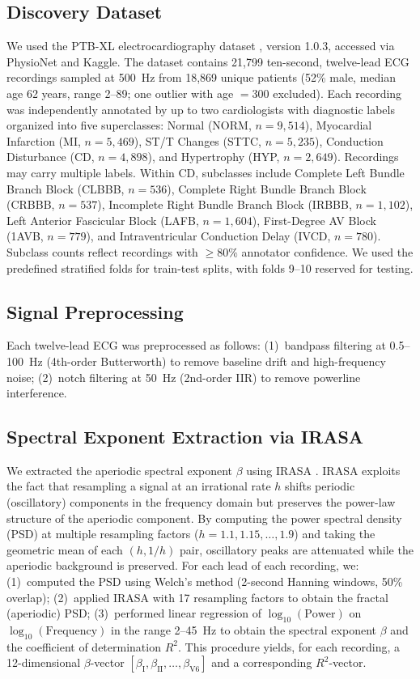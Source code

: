 \documentclass[11pt,a4paper]{article}
\begin{document}
\subsection{Discovery Dataset}
We used the PTB-XL electrocardiography dataset \citep{Wagner2020}, version 1.0.3, accessed via PhysioNet and Kaggle. The dataset contains 21,799 ten-second, twelve-lead ECG recordings sampled at 500~Hz from 18,869 unique patients (52\% male, median age 62 years, range 2--89; one outlier with age $= 300$ excluded). Each recording was independently annotated by up to two cardiologists with diagnostic labels organized into five superclasses: Normal (NORM, $n = 9{,}514$), Myocardial Infarction (MI, $n = 5{,}469$), ST/T Changes (STTC, $n = 5{,}235$), Conduction Disturbance (CD, $n = 4{,}898$), and Hypertrophy (HYP, $n = 2{,}649$). Recordings may carry multiple labels. Within CD, subclasses include Complete Left Bundle Branch Block (CLBBB, $n = 536$), Complete Right Bundle Branch Block (CRBBB, $n = 537$), Incomplete Right Bundle Branch Block (IRBBB, $n = 1{,}102$), Left Anterior Fascicular Block (LAFB, $n = 1{,}604$), First-Degree AV Block (1AVB, $n = 779$), and Intraventricular Conduction Delay (IVCD, $n = 780$). Subclass counts reflect recordings with $\geq 80\%$ annotator confidence. We used the predefined stratified folds for train-test splits, with folds 9--10 reserved for testing.
\subsection{Signal Preprocessing}
Each twelve-lead ECG was preprocessed as follows: (1)~bandpass filtering at 0.5--100~Hz (4th-order Butterworth) to remove baseline drift and high-frequency noise; (2)~notch filtering at 50~Hz (2nd-order IIR) to remove powerline interference.
\subsection{Spectral Exponent Extraction via IRASA}
We extracted the aperiodic spectral exponent $\beta$ using IRASA \citep{Wen2016}. IRASA exploits the fact that resampling a signal at an irrational rate $h$ shifts periodic (oscillatory) components in the frequency domain but preserves the power-law structure of the aperiodic component. By computing the power spectral density (PSD) at multiple resampling factors ($h = 1.1, 1.15, \ldots, 1.9$) and taking the geometric mean of each $(h, 1/h)$ pair, oscillatory peaks are attenuated while the aperiodic background is preserved.
For each lead of each recording, we: (1)~computed the PSD using Welch's method (2-second Hanning windows, 50\% overlap); (2)~applied IRASA with 17 resampling factors to obtain the fractal (aperiodic) PSD; (3)~performed linear regression of $\log_{10}(\text{Power})$ on $\log_{10}(\text{Frequency})$ in the range 2--45~Hz to obtain the spectral exponent $\beta$ and the coefficient of determination $R^2$.
This procedure yields, for each recording, a 12-dimensional $\beta$-vector $[\beta_\text{I}, \beta_\text{II}, \ldots, \beta_\text{V6}]$ and a corresponding $R^2$-vector.
\end{document}
